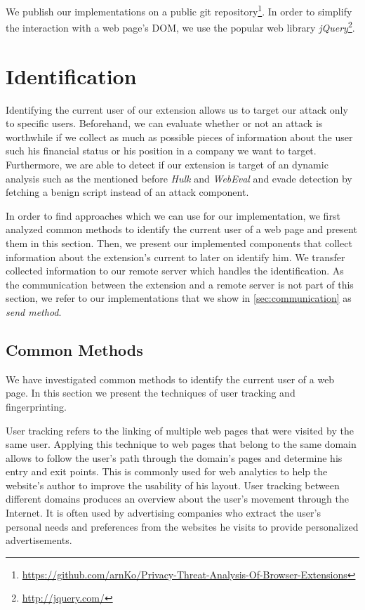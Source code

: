 	We publish our implementations on a public git repository\footnote{\url{https://github.com/arnKo/Privacy-Threat-Analysis-Of-Browser-Extensions}}. In order to simplify the interaction with a web page's DOM, we use the popular web library \textit{jQuery}\footnote{\url{http://jquery.com/}}. 

\newpage	
\section{Identification}
\label{sec:identification} 

	Identifying the current user of our extension allows us to target our attack only to specific users. Beforehand, we can evaluate whether or not an attack is worthwhile if we collect as much as possible pieces of information about the user such his financial status or his position in a company we want to target. Furthermore, we are able to detect if our extension is target of an dynamic analysis such as the mentioned before \textit{Hulk} and \textit{WebEval} and evade detection by fetching a benign script instead of an attack component.
	
	In order to find approaches which we can use for our implementation, we first analyzed common methods to identify the current user of a web page and present them in this section. Then, we present our implemented components that collect information about the extension's current to later on identify him. We transfer collected information to our remote server which handles the identification. As the communication between the extension and a remote server is not part of this section, we refer to our implementations that we show in \autoref{sec:communication} as \textit{send method}.
	
\subsection{Common Methods}

	We have investigated common methods to identify the current user of a web page. In this section we present the techniques of user tracking and fingerprinting. 

	User tracking refers to the linking of multiple web pages that were visited by the same user. Applying this technique to web pages that belong to the same domain allows to follow the user's path through the domain's pages and determine his entry and exit points. This is commonly used for web analytics to help the website's author to improve the usability of his layout. User tracking between different domains produces an overview about the user's movement through the Internet. It is often used by advertising companies who extract the user's personal needs and preferences from the websites he visits to provide personalized advertisements.
		
